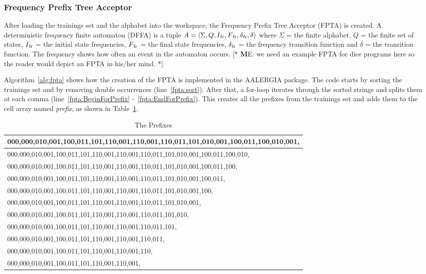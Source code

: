 \documentclass[
a4paper,     %
12pt         %
]{scrartcl}  %
\newcommand\me[1]{ [* {\textbf ME:} #1 *]}
\begin{document}
\subsubsection{Frequency Prefix Tree Acceptor}
After loading the trainings set and the alphabet into the workspace, the Frequency Prefix Tree Acceptor (FPTA) is created. A deterministic frequency finite automaton (DFFA) is a tuple $A = \langle \Sigma, Q, I\textsubscript{fr}, F\textsubscript{fr}, \delta\textsubscript{fr}, \delta \rangle$ where $ \Sigma $ = the finite alphabet, $Q$ = the finite set of states, $I\textsubscript{fr}$ = the initial state frequencies, $F\textsubscript{fr}$ = the final state frequencies, $\delta\textsubscript{fr}$ = the frequency transition function and $ \delta$ = the transition function. The frequency shows how often an event in the automaton occurs. \me{we need an example FPTA for dice programs here so the reader would depict an FPTA in his/her mind.}
\par Algorithm~\ref{alg:fpta} shows how the creation of the FPTA is implemented in the AALERGIA package. The code starts by sorting the trainings set and by removing double occurrences (line~\ref{fpta:sort}).
After that, a for-loop iterates through the sorted strings and splits them at each comma (line~\ref{fpta:BeginForPrefix} -~\ref{fpta:EndForPrefix}).
This creates all the prefixes from the trainings set and adds them to the cell array named \emph{prefix}, as shown in Table~\ref{table:prefix}.
\begin{table}[ht!]
\centering
\begin{tabular}{|l|}
\hline
000,000,010,001,100,011,101,110,001,110,001,110,011,101,010,001,100,011,100,010,001,   \\ \hline
000,000,010,001,100,011,101,110,001,110,001,110,011,101,010,001,100,011,100,010,   \\ \hline
000,000,010,001,100,011,101,110,001,110,001,110,011,101,010,001,100,011,100,   \\ \hline
000,000,010,001,100,011,101,110,001,110,001,110,011,101,010,001,100,011,   \\ \hline
000,000,010,001,100,011,101,110,001,110,001,110,011,101,010,001,100,   \\ \hline
000,000,010,001,100,011,101,110,001,110,001,110,011,101,010,001,   \\ \hline
000,000,010,001,100,011,101,110,001,110,001,110,011,101,010,   \\ \hline
000,000,010,001,100,011,101,110,001,110,001,110,011,101,   \\ \hline
000,000,010,001,100,011,101,110,001,110,001,110,011,   \\ \hline
000,000,010,001,100,011,101,110,001,110,001,110,   \\ \hline
000,000,010,001,100,011,101,110,001,110,001,   \\ \hline
\end{tabular}
\caption{The Prefixes}
\label{table:prefix}
\end{table}
\end{document}
